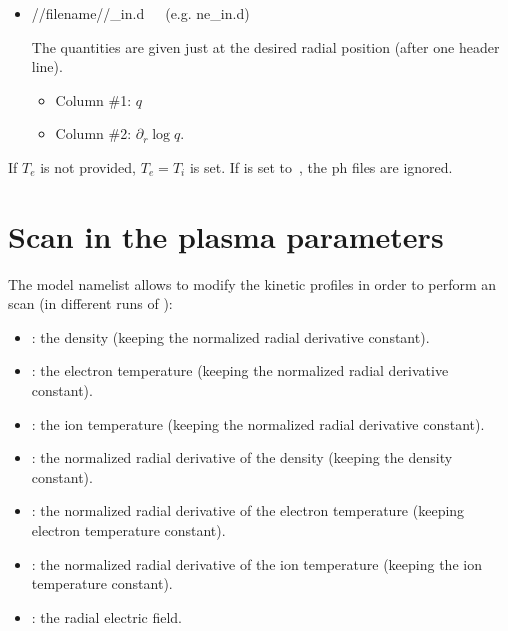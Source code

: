 \begin{itemize}
\item {\ttfamily //filename//\_in.d}~~~(e.g. {\ttfamily ne\_in.d})

The quantities are given just at the desired radial position (after one header line).
\begin{itemize}
\item Column \#1: $q$
\item Column \#2: $\partial_r \log{q}$.
\end{itemize}

\end{itemize}

If $T_e$ is not provided, $T_e=T_i$ is set. If  is set to~\true, the {\ttfamily ph} files are ignored.




\section{Scan in the plasma parameters}\label{SEC_SCAN_PLASMA}

The {\ttfamily model} namelist allows to modify the kinetic profiles in order to perform an scan (in different runs of \KNOSOS):
\begin{itemize}
\item {}: the density (keeping the normalized radial derivative constant).
\item {}: the electron temperature (keeping the normalized radial derivative constant).
\item {}: the ion temperature (keeping the normalized radial derivative constant).
\item {}: the normalized radial derivative of the density (keeping the density constant).
\item {}: the normalized radial derivative of the electron temperature (keeping electron temperature constant).
\item {}: the normalized radial derivative of the ion temperature (keeping the ion temperature constant).
\item {}: the radial electric field.
\end{itemize}

